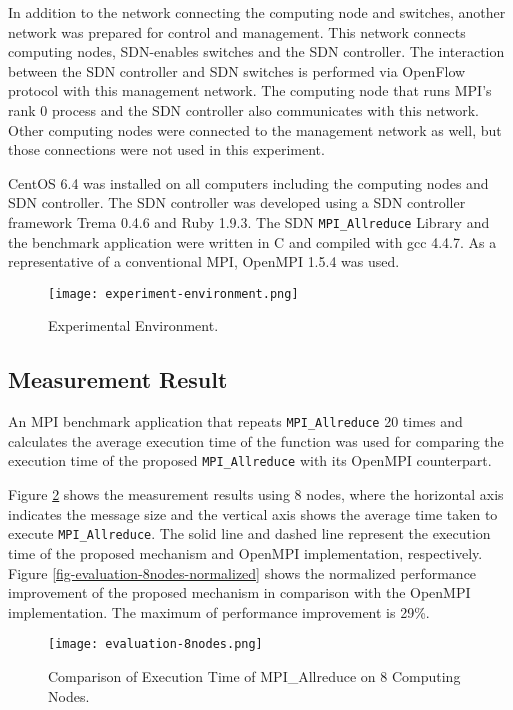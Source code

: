 In addition to the network connecting the computing node and switches,
another network was prepared for control and management. This network
connects computing nodes, SDN-enables switches and the SDN controller.
The interaction between the SDN controller and SDN switches is performed
via OpenFlow protocol with this management network. The computing node
that runs MPI's rank 0 process and the SDN controller also communicates
with this network. Other computing nodes were connected to the
management network as well, but those connections were not used in this
experiment.

CentOS 6.4 was installed on all computers including the computing nodes
and SDN controller. The SDN controller was developed using a SDN
controller framework Trema \cite{trema} 0.4.6 and Ruby \cite{ruby}
1.9.3. The SDN \texttt{MPI\_Allreduce} Library and the benchmark
application were written in C and compiled with gcc 4.4.7. As a
representative of a conventional MPI, OpenMPI \cite{Gabriel2004} 1.5.4
was used.

\begin{figure}[htbp]
    \centering
    \texttt{[image: experiment-environment.png]}
    \caption{Experimental Environment.}
    \label{fig-experiment-environment}
\end{figure}

\hypertarget{measurement-result}{%
\subsection{Measurement Result}\label{measurement-result}}

An MPI benchmark application that repeats \texttt{MPI\_Allreduce} 20
times and calculates the average execution time of the function was used
for comparing the execution time of the proposed \texttt{MPI\_Allreduce}
with its OpenMPI counterpart.

Figure \ref{fig-evaluation-8nodes} shows the measurement results using 8
nodes, where the horizontal axis indicates the message size and the
vertical axis shows the average time taken to execute
\texttt{MPI\_Allreduce}. The solid line and dashed line represent the
execution time of the proposed mechanism and OpenMPI implementation,
respectively. Figure \ref{fig-evaluation-8nodes-normalized} shows the
normalized performance improvement of the proposed mechanism in
comparison with the OpenMPI implementation. The maximum of performance
improvement is 29\%.

\begin{figure}[htbp]
    \centering
    \texttt{[image: evaluation-8nodes.png]}
    \caption{Comparison of Execution Time of MPI\_Allreduce on 8 Computing Nodes.}
    \label{fig-evaluation-8nodes}
\end{figure}

